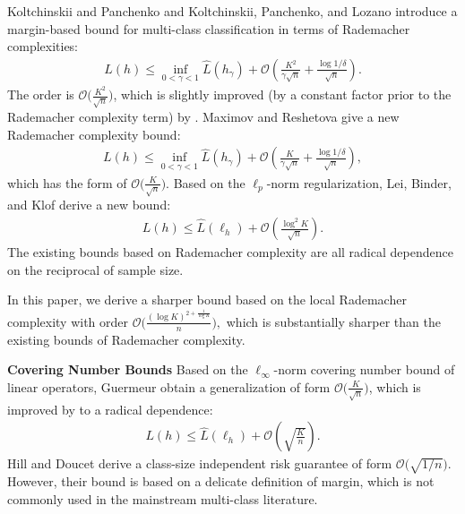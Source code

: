 \documentclass{article}
\begin{document}
Koltchinskii and Panchenko 
and Koltchinskii, Panchenko, and Lozano 
introduce a margin-based bound for multi-class classification in terms of Rademacher complexities:
\begin{align*}
  L(h)\leq \inf_{0<\gamma<1}\hat{L}(h_\gamma)+\mathcal{O}\left(\frac{K^2}{\gamma\sqrt{n}}+\frac{\log1/\delta}{\sqrt{n}}\right).
\end{align*}
The order is $\mathcal{O}\big(\frac{K^2}{\sqrt{n}}\big)$,
which is slightly improved (by a constant factor prior to the Rademacher complexity term)
by \cite{mohri2012foundations,cortes2013multi}.
Maximov and Reshetova  give a new Rademacher complexity bound:
\begin{align*}
  L(h)\leq \inf_{0<\gamma<1}\hat{L}(h_\gamma)+\mathcal{O}
  \left(\frac{K}{\gamma\sqrt{n}}+\frac{\log1/\delta}{\sqrt{n}}\right),
\end{align*}
which has the form of $\mathcal{O}\big(\frac{K}{\sqrt{n}}\big)$.
Based on the $\ell_p$-norm regularization,
Lei, Binder, and Klof  derive a new bound:
\begin{align*}
   L(h)\leq  \hat{L}(\ell_h) +\mathcal{O}\left(\frac{\log^2 K}{\sqrt{n}}\right).
\end{align*}
The existing bounds based on Rademacher complexity are all radical dependence
on the reciprocal of sample size.

In this paper,
we derive a sharper bound based on the local Rademacher complexity with order
$
\mathcal{O}\Big(\frac{(\log K)^{2+\frac{1}{\log K}}}{n}\Big),
$
which is substantially sharper
than the existing bounds of  Rademacher complexity.

\textbf{Covering Number Bounds}
Based on the $\ell_\infty$-norm covering number bound of
linear operators, Guermeur  obtain
a generalization of form $\mathcal{O}\big(\frac{K}{\sqrt{n}}\big)$,
which is improved by \cite{zhang2004statistical} to a radical dependence:
  \begin{align*}
   L(h)\leq  \hat{L}(\ell_h) +\mathcal{O}\left(\sqrt{\frac{K}{n}}\right).
\end{align*}
Hill and Doucet  derive a class-size independent risk guarantee
of form $\mathcal{O}\big(\sqrt{{1}/{n}}\big)$.
However, their bound is based on a delicate definition of margin,
which is not commonly  used in the mainstream multi-class literature.
\end{document}
